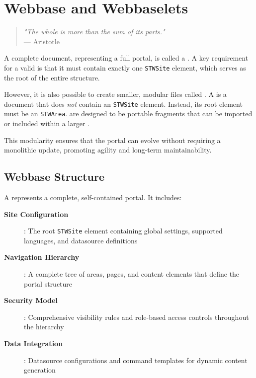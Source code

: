 
\chapter{Webbase and Webbaselets}
\label{chap:webbaselets}

\begin{quote}
\textit{"The whole is more than the sum of its parts."} \\
— Aristotle
\end{quote}

A complete \wbdl{} document, representing a full portal, is called a \textbf{\webbase{}}. A key requirement for a valid \webbase{} is that it must contain exactly one \texttt{STWSite} element, which serves as the root of the entire structure.

However, it is also possible to create smaller, modular \wbdl{} files called \textbf{}. A \webbaselet{} is a \wbdl{} document that does \emph{not} contain an \texttt{STWSite} element. Instead, its root element must be an \texttt{STWArea}.  are designed to be portable fragments that can be imported or included within a larger \webbase{}.

This modularity ensures that the portal can evolve without requiring a monolithic update, promoting agility and long-term maintainability.

\section{Webbase Structure}
\label{sec:webbase-structure}

A \webbase{} represents a complete, self-contained portal. It includes:

\begin{description}
\item[\textbf{Site Configuration}]: The root \texttt{STWSite} element containing global settings, supported languages, and datasource definitions
\item[\textbf{Navigation Hierarchy}]: A complete tree of areas, pages, and content elements that define the portal structure
\item[\textbf{Security Model}]: Comprehensive visibility rules and role-based access controls throughout the hierarchy
\item[\textbf{Data Integration}]: Datasource configurations and command templates for dynamic content generation
\end{description}

